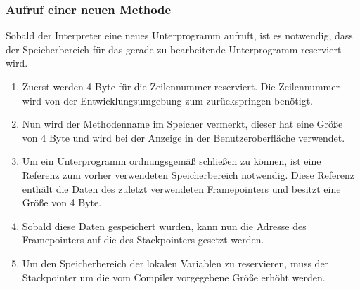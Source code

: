 %


\subsubsection{Aufruf einer neuen Methode}
\label{sec:memoryframe_open}
Sobald der Interpreter eine neues Unterprogramm aufruft, ist es notwendig, dass der Speicherbereich für das gerade zu bearbeitende Unterprogramm reserviert wird.
\begin{enumerate}
 \item Zuerst werden 4 Byte für die Zeilennummer reserviert. Die Zeilennummer wird von der Entwicklungsumgebung zum zurückspringen benötigt.
 \item Nun wird der Methodenname im Speicher vermerkt, dieser hat eine Größe von 4 Byte und wird bei der Anzeige in der Benutzeroberfläche verwendet.
 \item Um ein Unterprogramm ordnungsgemäß schließen zu können, ist eine Referenz zum vorher verwendeten Speicherbereich notwendig. Diese Referenz enthält die Daten des zuletzt verwendeten Framepointers und besitzt eine Größe von 4 Byte.
 \item Sobald diese Daten gespeichert wurden, kann nun die Adresse des Framepointers auf die des Stackpointers gesetzt werden.
 \item Um den Speicherbereich der lokalen Variablen zu reservieren, muss der Stackpointer um die vom Compiler vorgegebene Größe erhöht werden.
\end{enumerate}
 
